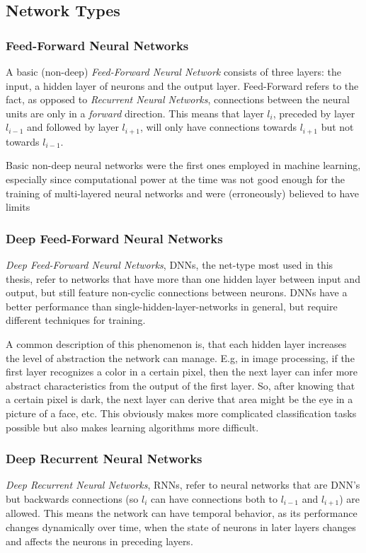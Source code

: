 \subsection{Network Types}
\label{sec:fund:types}

\subsubsection{Feed-Forward Neural Networks}
A basic (non-deep) \textit{Feed-Forward Neural Network} consists of three layers: the input, a hidden layer of neurons and the output layer. Feed-Forward refers to the fact, as opposed to \textit{Recurrent Neural Networks}, connections between the neural units are only in a \textit{forward} direction. This means that layer \(l_i\), preceded by layer \(l_{i-1}\) and followed by layer \(l_{i+1}\), will only have connections towards \(l_{i+1}\) but not towards \(l_{i-1}\).

Basic non-deep neural networks were the first ones employed in machine learning, especially since computational power at the time was not good enough for the training of multi-layered neural networks and were (erroneously) believed to have limits~\cite{minsky1988perceptrons}


\subsubsection{Deep Feed-Forward Neural Networks}
\textit{Deep Feed-Forward Neural Networks}, DNNs, the net-type most used in this thesis, refer to networks that have more than one hidden layer between input and output, but still feature non-cyclic connections between neurons. DNNs have a better performance than single-hidden-layer-networks in general, but require different techniques for training. 

A common description of this phenomenon is, that each hidden layer increases the level of abstraction the network can manage. E.g, in image processing, if the first layer recognizes a color in a certain pixel, then the next layer can infer more abstract characteristics from the output of the first layer. So, after knowing that a certain pixel is dark, the next layer can derive that area might be the eye in a picture of a face, etc. This obviously makes more complicated classification tasks possible but also makes learning algorithms more difficult.

\subsubsection{Deep Recurrent Neural Networks}
\textit{Deep Recurrent Neural Networks}, RNNs, refer to neural networks that are DNN's but backwards connections (so \(l_i\) can have connections both to \(l_{i-1}\) and \(l_{i+1}\)) are allowed. This means the network can have temporal behavior, as its performance changes dynamically over time, when the state of neurons in later layers changes and affects the neurons in preceding layers.

